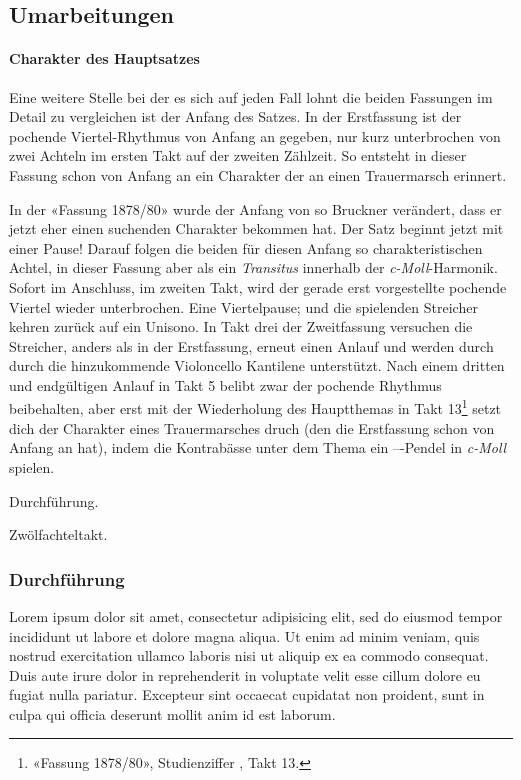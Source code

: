 \subsection{Umarbeitungen}

\paragraph{Charakter des Hauptsatzes}

Eine weitere Stelle bei der es sich auf jeden Fall lohnt die beiden Fassungen im Detail zu vergleichen ist der Anfang des Satzes.
In der Erstfassung ist der pochende Viertel-Rhythmus von Anfang an gegeben, nur kurz unterbrochen von zwei Achteln im ersten Takt auf der zweiten Zählzeit. So entsteht in dieser Fassung schon von Anfang an ein Charakter der an einen Trauermarsch erinnert.

In der «Fassung 1878/80» wurde der Anfang von so Bruckner verändert, dass er jetzt eher einen suchenden Charakter bekommen hat.
Der Satz beginnt jetzt mit einer Pause! Darauf folgen die beiden für diesen Anfang so charakteristischen Achtel, in dieser Fassung aber als ein \emph{Transitus} innerhalb der \emph{c-Moll}-Harmonik.
Sofort im Anschluss, im zweiten Takt, wird der gerade erst vorgestellte pochende Viertel wieder unterbrochen.
Eine Viertelpause; und die spielenden Streicher kehren zurück auf ein Unisono.
In Takt drei der Zweitfassung versuchen die Streicher, anders als in der Erstfassung, erneut einen Anlauf und werden durch durch die hinzukommende Violoncello Kantilene unterstützt.
Nach einem dritten und endgültigen Anlauf in Takt 5 belibt zwar der pochende Rhythmus beibehalten, aber erst mit der Wiederholung des Hauptthemas in Takt 13\footnote{«Fassung 1878/80», Studienziffer , Takt 13.} setzt dich der Charakter eines Trauermarsches druch (den die Erstfassung schon von Anfang an hat), indem die Kontrabässe unter dem Thema ein ---Pendel in \emph{c-Moll} spielen.

Durchführung.

Zwölfachteltakt.

\subsubsection{Durchführung}

Lorem ipsum dolor sit amet, consectetur adipisicing elit, sed do eiusmod tempor incididunt ut labore et dolore magna aliqua. Ut enim ad minim veniam, quis nostrud exercitation ullamco laboris nisi ut aliquip ex ea commodo consequat. Duis aute irure dolor in reprehenderit in voluptate velit esse cillum dolore eu fugiat nulla pariatur. Excepteur sint occaecat cupidatat non proident, sunt in culpa qui officia deserunt mollit anim id est laborum.

